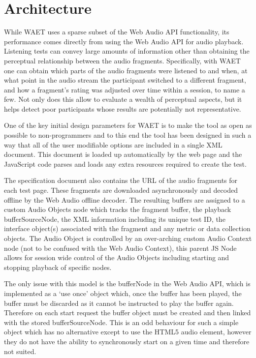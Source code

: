 \documentclass{sig-alternate}
\begin{document}
\section{Architecture}  %
	\label{sec:architecture}

    While WAET uses a sparse subset of the Web Audio API functionality, its performance comes directly from using the Web Audio API for audio playback. Listening tests can convey large amounts of information other than obtaining the perceptual relationship between the audio fragments. Specifically, with WAET one can obtain which parts of the audio fragments were listened to and when, at what point in the audio stream the participant switched to a different fragment, and how a fragment's rating was adjusted over time within a session, to name a few. Not only does this allow to evaluate a wealth of perceptual aspects, but it helps detect poor participants whose results are potentially not representative. 
    
    One of the key initial design parameters for WAET is to make the tool as open as possible to non-programmers and to this end the tool has been designed in such a way that all of the user modifiable options are included in a single XML document. This document is loaded up automatically by the web page and the JavaScript code parses and loads any extra resources required to create the test.
    
    The specification document also contains the URL of the audio fragments for each test page. These fragments are downloaded asynchronously and decoded offline by the Web Audio offline decoder. The resulting buffers are assigned to a custom Audio Objects node which tracks the fragment buffer, the playback bufferSourceNode, the XML information including its unique test ID, the interface object(s) associated with the fragment and any metric or data collection objects. The Audio Object is controlled by an over-arching custom Audio Context node (not to be confused with the Web Audio Context), this parent JS Node allows for session wide control of the Audio Objects including starting and stopping playback of specific nodes.
    
    The only issue with this model is the bufferNode in the Web Audio API, which is implemented as a `use once' object which, once the buffer has been played, the buffer must be discarded as it cannot be instructed to play the buffer again. Therefore on each start request the buffer object must be created and then linked with the stored bufferSourceNode. This is an odd behaviour for such a simple object which has no alternative except to use the HTML5 audio element, however they do not have the ability to synchronously start on a given time and therefore not suited.
    
\end{document}
